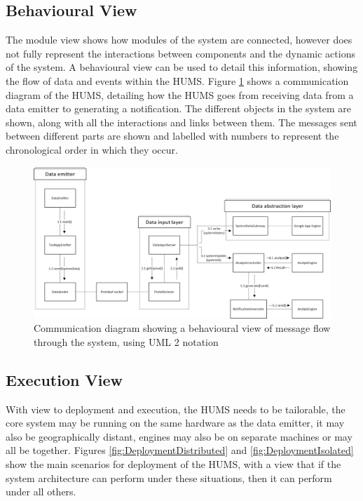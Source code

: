 \documentclass[10pt,a4paper]{article}
\begin{document}
\subsection{Behavioural View}

The module view shows how modules of the system are connected, however 
does not fully represent the interactions between components and the dynamic actions of the system. A behavioural view can be used to detail this information, showing the flow of data and events within the HUMS. Figure \ref{fig:CommunicationDiagram} shows a communication diagram of the 
HUMS, detailing how the HUMS goes from receiving data from a data emitter to generating a notification. The different objects in the system are shown, along with all the interactions and links between them. The messages sent between different parts are shown and labelled with numbers to represent the chronological order in which they occur.

\begin{figure}[!ht]
  \centering
  \includegraphics[width=14cm]{images/CommunicationDiagram.png}
  \caption{Communication diagram showing a behavioural view of message 
flow
through the system, using UML 2 notation}
  \label{fig:CommunicationDiagram}
\end{figure}


\subsection{Execution View}
With view to deployment and execution, the HUMS needs to be tailorable, the core system may be running on the same hardware as the data emitter, it may also be geographically distant, engines may also be on separate machines or may all be together. Figures \ref{fig:DeploymentDistributed} and \ref{fig:DeploymentIsolated} show the main scenarios for deployment of the HUMS, with a view that if the system architecture can perform under these situations, then it can perform under all others.
\end{document}
